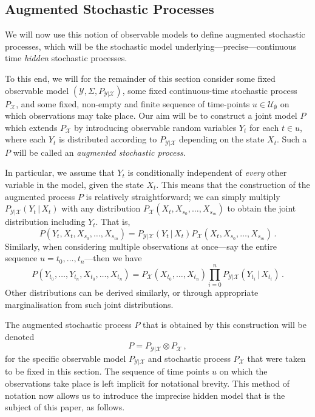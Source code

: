 \documentclass[twoside,11pt]{article}
\newcommand{\states}{\mathcal{X}}
\newcommand{\observs}{\mathcal{Y}}
\begin{document}
\subsection{Augmented Stochastic Processes}\label{sec:aug_stochastic_processes}
We will now use this notion of observable models to define augmented stochastic processes, which will be the stochastic model underlying---precise---continuous time \emph{hidden} stochastic processes. 

To this end, we will for the remainder of this section consider some fixed observable model $(\observs,\Sigma,P_{\observs\vert\states})$, some fixed continuous-time stochastic process $P_\states$, and some fixed, non-empty and finite sequence of time-points $u\in\mathcal{U}_{\emptyset}$ on which observations may take place. Our aim will be to construct a joint model $P$ which extends $P_\states$ by introducing observable random variables $Y_t$ for each $t\in u$, where each $Y_t$ is distributed according to $P_{\observs\vert\states}$ depending on the state $X_t$. Such a $P$ will be called an \emph{augmented stochastic process}.

In particular, we assume that $Y_t$ is conditionally independent of \emph{every} other variable in the model, given the state $X_t$. This means that the construction of the augmented process $P$ is relatively straightforward; we can simply multiply $P_{\observs\vert\states}(Y_t\,\vert\,X_t)$ with any distribution $P_\states(X_t,X_{s_0},\ldots,X_{s_m})$ to obtain the joint distribution including $Y_t$. That is,
\begin{equation*}
P(Y_t,X_t,X_{s_0},\ldots,X_{s_m}) = P_{\observs\vert\states}(Y_t\,\vert\,X_t)P_\states(X_t,X_{s_0},\ldots,X_{s_m})\,.
\end{equation*}
Similarly, when considering multiple observations at once---say the entire sequence $u=t_0,\ldots,t_n$---then we have
\begin{equation*}
P(Y_{t_0},\ldots,Y_{t_n},X_{t_0},\ldots,X_{t_n}) = P_\states(X_{t_0},\ldots,X_{t_n})\prod_{i=0}^n P_{\observs\vert\states}(Y_{t_i}\,\vert\,X_{t_i})\,.
\end{equation*}
Other distributions can be derived similarly, or through appropriate marginalisation from such joint distributions.

The augmented stochastic process $P$ that is obtained by this construction will be denoted
\begin{equation*}
P=P_{\observs\vert\states}\otimes P_\states\,,
\end{equation*}
for the specific observable model $P_{\observs\vert\states}$ and stochastic process $P_\states$ that were taken to be fixed in this section. The sequence of time points $u$ on which the observations take place is left implicit for notational brevity. This method of notation now allows us to introduce the imprecise hidden model that is the subject of this paper, as follows.
\end{document}

